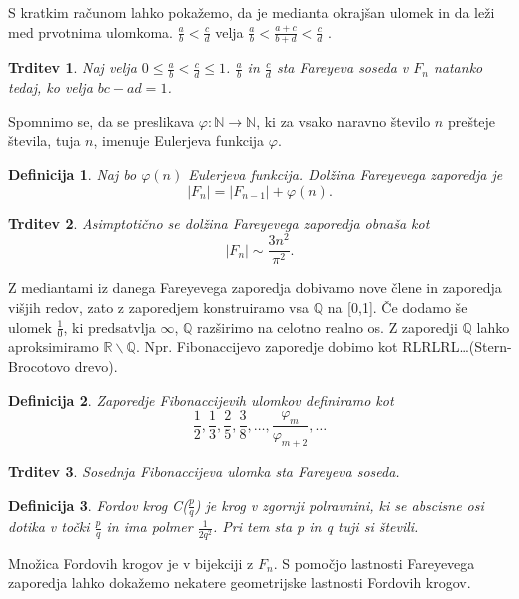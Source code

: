 \documentclass[a4paper,9pt]{article}
\newtheorem{trditev}{Trditev}
\newtheorem{definicija}{Definicija}
\begin{document}
S kratkim računom lahko pokažemo, da je medianta okrajšan ulomek in da leži med prvotnima ulomkoma.
 \(\frac{a}{b} < \frac{c}{d}\) velja  \(\frac{a}{b} < \frac{a+c}{b+d} < \frac{c}{d}\) .

\begin{trditev}
Naj velja \( 0 \leq \frac{a}{b} < \frac{c}{d} \leq 1\). $\frac{a}{b}$ in $\frac{c}{d}$ sta Fareyeva soseda v $F_n$ natanko tedaj, ko velja \(bc - ad = 1\).
\end{trditev}

Spomnimo se, da se preslikava \( \varphi \colon \mathbb{N} \rightarrow  \mathbb{N}\), ki za vsako naravno število $n$ prešteje števila, tuja $n$, imenuje Eulerjeva funkcija $\varphi$.

\begin{definicija}
Naj bo $\varphi(n)$ Eulerjeva funkcija. Dolžina Fareyevega zaporedja je
\[  |F_{n}| = |F_{n-1}| + \varphi(n). \]
\end{definicija}

\begin{trditev}
Asimptotično se dolžina Fareyevega zaporedja obnaša kot
\[  |F_{n}|\sim\frac{3n^2}{\pi^2}. \]
\end{trditev}

Z mediantami iz danega Fareyevega zaporedja dobivamo nove člene in zaporedja višjih redov, zato z zaporedjem konstruiramo vsa $\mathbb{Q}$ na [0,1]. Če dodamo še ulomek $\frac{1}{0}$, ki predsatvlja $\infty$, $\mathbb{Q}$ razširimo na celotno realno os. Z zaporedji $\mathbb{Q}$ lahko aproksimiramo $\mathbb{R}\backslash\mathbb{Q}$. Npr. Fibonaccijevo zaporedje dobimo kot RLRLRL\ldots (Stern-Brocotovo drevo).

\begin{definicija}
Zaporedje Fibonaccijevih ulomkov definiramo kot
\[ \frac{1}{2}, \frac{1}{3}, \frac{2}{5}, \frac{3}{8}, \dots , \frac{\varphi_m}{\varphi_{m+2}}, \dots \]
\end{definicija}

\begin{trditev}
Sosednja Fibonaccijeva ulomka sta Fareyeva soseda.
\end{trditev}

\begin{definicija}
Fordov krog C($\frac{p}{q}$) je krog v zgornji polravnini, ki se abscisne osi dotika v točki $\frac{p}{q}$ in ima polmer $\frac{1}{2q^2}$. Pri tem sta p in q tuji si števili. 
\end{definicija}

Množica Fordovih krogov je v bijekciji z $F_{n}$. S pomočjo lastnosti Fareyevega zaporedja lahko dokažemo nekatere geometrijske lastnosti Fordovih krogov.
\end{document}
